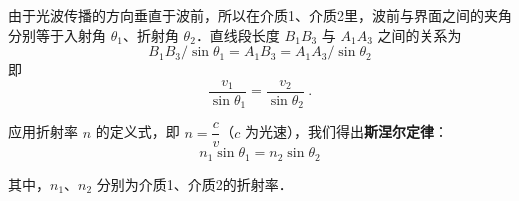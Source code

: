 由于光波传播的方向垂直于波前，所以在介质1、介质2里，波前与界面之间的夹角分别等于入射角 $\theta_1$、折射角 $\theta_2$．直线段长度 $B_{1}B_{3}$ 与 $A_{1}A_{3}$ 之间的关系为
\begin{equation}
B_{1}B_{3}/\sin \theta _{1}=A_{1}B_{3}=A_{1}A_{3}/\sin \theta _{2}
\end{equation}
即
\begin{equation}
{\frac  {v_{1}}{\sin \theta _{1}}}={\frac  {v_{2}}{\sin \theta _{2}}}~.
\end{equation}

应用折射率 $n$ 的定义式，即 $n {=}\dfrac{c}{v}$（$c$ 为光速），我们得出\textbf{斯涅尔定律}：
\begin{equation}
n_1\sin\theta_1=n_2\sin\theta_2
\end{equation}

其中，$n_{1}$、$n_{2}$ 分别为介质1、介质2的折射率．